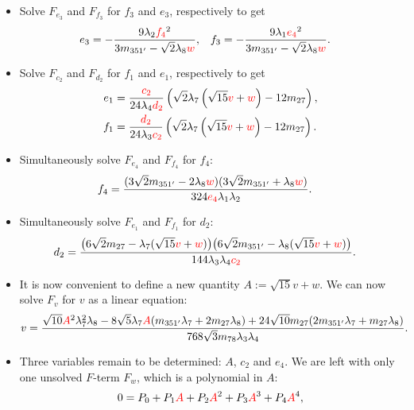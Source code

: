 \documentclass[a4paper,12pt]{article}
\def\RED{\textcolor{red}}
\begin{document}
\begin{itemize}
the system of equations is greatly simplified: $F_{c_1},F_{d_1},F_{e_2},F_{f_2},F_{e_5},F_{f_5},F_{u_1},F_{u_2},F_y$ and $D^{III}$ are solved automatically.
\item Solve $F_{e_3}$ and $F_{f_3}$ for $f_3$ and $e_3$, respectively to get
    \begin{align}
    e_3&=-\frac{9 \lambda_2 \RED{f_4}^2}{3 m_{351'}-\sqrt{2} \lambda_8 \RED{w}},&
    f_3&=-\frac{9 \lambda_1 \RED{e_4}^2}{3 m_{351'}-\sqrt{2} \lambda_8 \RED{w}}.
    \end{align}
\item Solve $F_{c_2}$ and $F_{d_2}$ for $f_1$ and $e_1$, respectively to get
    \begin{align}
    e_1&=\frac{\RED{c_2}}{24 \lambda_4 \RED{d_2}}\left(\sqrt{2} \lambda_7 \left(\sqrt{15} \RED{v}+\RED{w}\right)-12 m_{27} \right),\\
    f_1&=\frac{\RED{d_2}}{24 \lambda_3 \RED{c_2}}\left(\sqrt{2} \lambda_7 \left(\sqrt{15} \RED{v}+\RED{w}\right)-12 m_{27} \right).
    \end{align}
\item Simultaneously solve $F_{e_4}$ and $F_{f_4}$ for $f_4$:
    \begin{align}
    f_4&=\frac{(3 \sqrt{2} m_{351'}-2 \lambda_8 \RED{w})(3 \sqrt{2} m_{351'}+\lambda_8\RED{w})}{324 \RED{e_4} \lambda _1 \lambda _2}.
    \end{align}
\item Simultaneously solve $F_{e_1}$ and $F_{f_1}$ for $d_2$:
    \begin{align}
    d_2&=\frac{\big(6\sqrt{2}m_{27}-\lambda_7(\sqrt{15}\RED{v}+\RED{w})\big)\big(6\sqrt{2}m_{351'}-\lambda_8 (\sqrt{15}\RED{v}+\RED{w})\big)}{144 \lambda_3 \lambda_4 \RED{c_2}}.
    \end{align}
\item It is now convenient to define a new quantity $A:=\sqrt{15} v+ w$. We can now solve $F_{v}$ for $v$ as a linear equation:
    \begin{align}
    v&=\frac{\sqrt{10} \RED{A}^2 \lambda_7^2 \lambda_8-8 \sqrt{5} \lambda_7\RED{A} (m_{351'}\lambda_7 +2 m_{27}\lambda_8)+24 \sqrt{10} m_{27} (2 m_{351'} \lambda_7+m_{27} \lambda_8)}{768 \sqrt{3} m_{78} \lambda_3 \lambda_4}.
    \end{align}
\item Three variables remain to be determined: $A$, $c_2$ and $e_4$. We are left with only one unsolved $F$-term $F_{w}$, which is a polynomial in $A$:
    \begin{align}
    0&=P_0+P_1 \RED{A}+P_2 \RED{A}^2+P_3 \RED{A}^3+P_4 \RED{A}^4,\\

\end{align}
\end{itemize}
\end{document}
